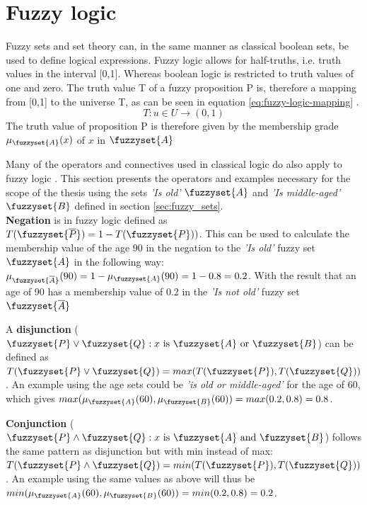 \section{Fuzzy logic}
\label{section:fuzzy_logic}
Fuzzy sets and set theory can, in the same manner as classical boolean sets, be used to define logical expressions. Fuzzy logic allows for half-truths, i.e. truth values in the interval [0,1]. Whereas boolean logic is restricted to truth values of one and zero. The truth value T of a fuzzy proposition P is, therefore a mapping from [0,1] to the universe T, as can be seen in equation \ref{eq:fuzzy-logic-mapping} \cite{ross2009fuzzy}.
\begin{equation}
    T:u\in U\rightarrow (0,1)
    \label{eq:fuzzy-logic-mapping}
\end{equation}
The truth value of proposition P is therefore given by the membership grade $\mu_{\fuzzyset{A}}(x)$ of $x$ in $\fuzzyset{A}$

Many of the operators and connectives used in classical logic do also apply to fuzzy logic \cite{ross2009fuzzy}.
This section presents the operators and examples   necessary for the scope of the thesis using the sets \textit{'Is old'} $\fuzzyset{A}$ and \textit{'Is middle-aged'} $\fuzzyset{B}$  defined in section \ref{sec:fuzzy_sets}.\\

\textbf{Negation} is in fuzzy logic defined as $ T(\fuzzyset{\overline{P}})=1-T(\fuzzyset{P}))$. This can be used to calculate the membership value of the age 90 in the negation to the \textit{'Is old'}  fuzzy set $\fuzzyset{A}$ in the following way:
$\mu_{\fuzzyset{\overline{A}}}(90)=1-\mu_{\fuzzyset{A}}(90)=1-0.8=0.2$. With the result that an age of 90 has a membership value of 0.2 in the \textit{'Is not old'} fuzzy set $\fuzzyset{\overline{A}}$

A \textbf{disjunction} ($\fuzzyset{P}\lor \fuzzyset{Q}:x \text{ is } \fuzzyset{A} \text{ or } \fuzzyset{B}$)   can be defined as   $T(\fuzzyset{P} \lor \fuzzyset{Q}) = \\ max(T(\fuzzyset{P}),T(\fuzzyset{Q}))$. An example using the age sets could be \textit{'is old or middle-aged'} for the age of 60, which gives $max(\mu_{\fuzzyset{A}}(60),\mu_{\fuzzyset{B}}(60))=max(0.2,0.8)=0.8$.

\textbf{Conjunction} ($\fuzzyset{P}\land \fuzzyset{Q}:x \text{ is } \fuzzyset{A} \text{ and } \fuzzyset{B}$) follows the same pattern as disjunction but with min instead of max: $T(\fuzzyset{P} \land \fuzzyset{Q})=min(T(\fuzzyset{P}),T(\fuzzyset{Q}))$.
An example using the same values as above will thus be $min(\mu_{\fuzzyset{A}}(60),\mu_{\fuzzyset{B}}(60))=min(0.2,0.8)=0.2$.

